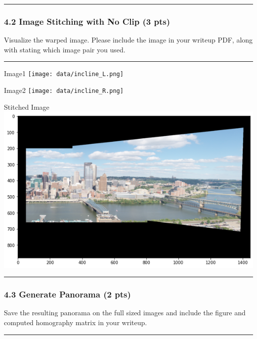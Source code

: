 \documentclass[11pt]{article}
\begin{document}
\begin{center}\rule{0.5\linewidth}{0.5pt}\end{center}

    \hypertarget{image-stitching-with-no-clip-3-pts}{%
\subsubsection{4.2 Image Stitching with No Clip (3
pts)}\label{image-stitching-with-no-clip-3-pts}}

Visualize the warped image. Please include the image in your writeup
PDF, along with stating which image pair you used.

    \begin{center}\rule{0.5\linewidth}{0.5pt}\end{center}

Image1 \texttt{[image: data/incline\_L.png]}

Image2 \texttt{[image: data/incline\_R.png]}

Stitched Image \includegraphics{results/q4_2.png}

\begin{center}\rule{0.5\linewidth}{0.5pt}\end{center}

    \hypertarget{generate-panorama-2-pts}{%
\subsubsection{4.3 Generate Panorama (2
pts)}\label{generate-panorama-2-pts}}

Save the resulting panorama on the full sized images and include the
figure and computed homography matrix in your writeup.

    \begin{center}\rule{0.5\linewidth}{0.5pt}\end{center}
\end{document}
